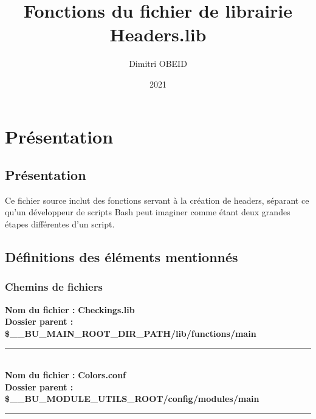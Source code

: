 \documentclass[a4paper,10pt]{article}
\title{\color{red}Fonctions du fichier de librairie \color{lime}Headers.lib}\color{white}
\author{Dimitri OBEID}
\date{2021}
\begin{document}
 \maketitle
 \tableofcontents
 \newpage

\color{red}
\section{Présentation}\color{white}

\color{green}
\subsection{Présentation}\color{white}
Ce fichier source inclut des fonctions servant à la création de headers, séparant ce qu'un développeur de scripts Bash peut imaginer comme étant deux grandes étapes différentes d'un script.\\[1\baselineskip]

\color{green}
\subsection{Définitions des éléments mentionnés}\color{white}

\color{blue}
\subsubsection{Chemins de fichiers}\color{white}
\textbf{Nom du fichier :} \textbf{\color{lime}Checkings.lib\color{white}}\\[1\baselineskip]
\textbf{Dossier parent :} \textbf{\color{orange}\$\_\_BU\_MAIN\_ROOT\_DIR\_PATH\color{lime}/lib/functions/main\color{white}}\\[1\baselineskip]



\color{lime}\par\noindent\rule{\textwidth}{0.4pt}\color{white}\\[1\baselineskip]

\textbf{Nom du fichier :} \textbf{\color{lime}Colors.conf\color{white}}\\[1\baselineskip]
\textbf{Dossier parent :} \textbf{\color{orange}\$\_\_BU\_MODULE\_UTILS\_ROOT\color{lime}/config/modules/main\color{white}}\\[1\baselineskip]



\color{lime}\par\noindent\rule{\textwidth}{0.4pt}\color{white}\\[1\baselineskip]
\end{document}
